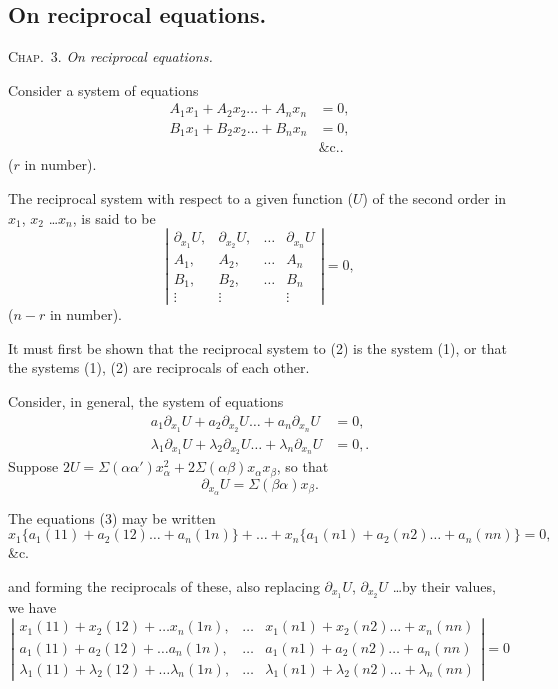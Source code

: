 \documentclass[11pt,a4paper]{book}
\begin{document}
\newpage
\subsection{On reciprocal equations.}

\textsc{Chap.\ 3.} \textit{On reciprocal equations.}

Consider a system of equations
\begin{align*}
A_1 x_1 + A_2 x_2 \ldots + A_n x_n &= 0, \\
B_1 x_1 + B_2 x_2 \ldots + B_n x_n &= 0, \\
&\text{\&c.} \tag{1}.
\end{align*}
($r$ in number).

The reciprocal system with respect to a given function ($U$) of the second order
in $x_1$, $x_2$ \ldots $x_n$, is said to be
\[
\left|
\begin{array}{ccccc}
\partial_{x_1} U, & \partial_{x_2} U, & \ldots & \partial_{x_n} U \\
A_1, & A_2, & \ldots & A_n \\
B_1, & B_2, & \ldots & B_n \\
\vdots & \vdots & & \vdots
\end{array}
\right| = 0
\tag{2},
\]
($n-r$ in number).

It must first be shown that the reciprocal system to (2) is the system (1), or
that the systems (1), (2) are reciprocals of each other.

Consider, in general, the system of equations
\begin{align*}
a_1 \partial_{x_1} U + a_2 \partial_{x_2} U \ldots + a_n \partial_{x_n} U &= 0, \\
\lambda_1 \partial_{x_1} U + \lambda_2 \partial_{x_2} U \ldots + \lambda_n \partial_{x_n} U &= 0,
\tag{3}.
\end{align*}
Suppose $2U = \Sigma(\alpha\alpha') x_\alpha^2 + 2\Sigma(\alpha\beta) x_\alpha x_\beta$, so that
\[
\partial_{x_\alpha} U = \Sigma(\beta\alpha) x_\beta \tag{4}.
\]

The equations (3) may be written
\[
x_1 \{a_1(11) + a_2(12) \ldots + a_n(1n)\} + \ldots + x_n \{a_1(n1) + a_2(n2) \ldots + a_n(nn)\} = 0
\tag{6},
\]
\&c.

and forming the reciprocals of these, also replacing $\partial_{x_1} U$, $\partial_{x_2} U$ \ldots by their values, we
have
\[
\left|
\begin{array}{cccc}
x_1(11) + x_2(12) + \ldots x_n(1n), & \ldots & x_1(n1) + x_2(n2) \ldots + x_n(nn) \\
a_1(11) + a_2(12) + \ldots a_n(1n), & \ldots & a_1(n1) + a_2(n2) \ldots + a_n(nn) \\
\lambda_1(11) + \lambda_2(12) + \ldots \lambda_n(1n), & \ldots & \lambda_1(n1) + \lambda_2(n2) \ldots + \lambda_n(nn)
\end{array}
\right| = 0
\]
\end{document}

